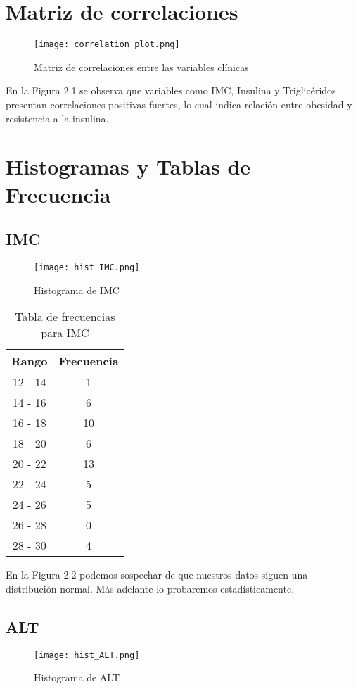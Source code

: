 \documentclass[12pt]{report}
\begin{document}
\section{Matriz de correlaciones}
\begin{figure}[H]
    \centering
    \texttt{[image: correlation\_plot.png]}
    \caption{Matriz de correlaciones entre las variables clínicas}
\end{figure}

\noindent En la Figura 2.1 se observa que variables como IMC, Insulina y Triglicéridos presentan correlaciones positivas fuertes, lo cual indica relación entre obesidad y resistencia a la insulina.
\section{Histogramas y Tablas de Frecuencia}

\subsection{IMC}
\begin{figure}[H]
    \centering
    \texttt{[image: hist\_IMC.png]}
    \caption{Histograma de IMC}
\end{figure}

\begin{table}[H]
    \centering
    \begin{tabular}{|c|c|}
        \hline
        \textbf{Rango} & \textbf{Frecuencia} \\
        \hline
        12 - 14 & 1 \\
        14 - 16 & 6 \\
        16 - 18 & 10 \\
        18 - 20 & 6 \\
        20 - 22 & 13 \\
        22 - 24 & 5 \\
        24 - 26 & 5 \\
        26 - 28 & 0 \\
        28 - 30 & 4 \\
        \hline
    \end{tabular}
    \caption{Tabla de frecuencias para IMC}
\end{table}
\noindent En la Figura 2.2 podemos sospechar de que nuestros datos siguen una distribución normal. Más adelante lo probaremos estadísticamente.
\subsection{ALT}
\begin{figure}[H]
    \centering
    \texttt{[image: hist\_ALT.png]}
    \caption{Histograma de ALT}
\end{figure}
\end{document}
